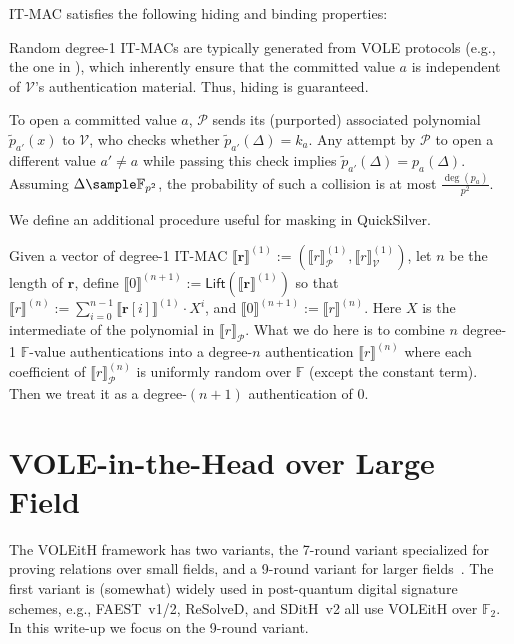 \documentclass[11pt,a4paper]{article}
\theoremstyle{definition}
\theoremstyle{remark}
\newcommand{\F}{\mathbb{F}}
\newcommand{\itmac}[1]{\llbracket {#1} \rrbracket}
\newcommand{\itmacP}[1]{\llbracket {#1} \rrbracket_{\calP}}
\newcommand{\itmacV}[1]{\llbracket {#1} \rrbracket_{\calV}}
\providecommand{\FF}{\mathbb{F}}
\newcommand{\calP}{\mathcal{P}}
\newcommand{\calV}{\mathcal{V}}
\renewcommand{\vec}[1]{\mathbf{#1}}
\begin{document}
IT-MAC satisfies the following hiding and binding properties:
\begin{description}[leftmargin=0.9em, labelsep=0.5em]
	\item[Hiding.] Random degree-1 IT-MACs are typically generated from VOLE protocols
		(e.g., the one in ), which inherently ensure
		that the committed value $a$ is independent of $\calV$'s
		authentication material. Thus, hiding is guaranteed.

	\item[Binding.] To open a committed value $a$, $\calP$ sends its
		(purported) associated polynomial $\tilde{p}_{a'}(x)$ to $\calV$,
		who checks whether $\tilde{p}_{a'}(\Delta) = k_a$.
		Any attempt by $\calP$ to open a different value $a' \neq a$
		while passing this check implies
		$\tilde{p}_{a'}(\Delta) = p_a(\Delta)$.
		Assuming $\Delta \sample \F_{p^2}$, the probability of such a
		collision is at most $\frac{\deg(p_a)}{p^2}$.
\end{description}

We define an additional procedure useful for masking in QuickSilver.
\begin{description}[leftmargin=0.9em, labelsep=0.5em]
	\item[Lifting.] Given a vector of degree-1 IT-MAC 
	$\itmac{\vec{r}}^{(1)} := (\itmacP{r}^{(1)}, \itmacV{r}^{(1)})$, 
	let $n$ be the length of $\vec{r}$, 
	define $\itmac{0}^{(n+1)} := \mathsf{Lift}(\itmac{\vec{r}}^{(1)})$ so that
	$\itmac{r}^{(n)} := \sum_{i = 0}^{n-1} \itmac{\vec{r}[i]}^{(1)} \cdot X^{i}$, and 
	$\itmac{0}^{(n+1)} := \itmac{r}^{(n)}$.
	Here $X$ is the intermediate of the polynomial in $\itmacP{r}$.
	What we do here is to combine $n$ degree-1 $\F$-value authentications
	into a degree-$n$ authentication $\itmac{r}^{(n)}$ where each coefficient of 
	$\itmacP{r}^{(n)}$ is uniformly random over $\F$ (except the constant term).
	Then we treat it as a degree-$(n+1)$ authentication of $0$.
\end{description}


\section{VOLE-in-the-Head over Large Field}
\label{sec:voleith}

The VOLEitH framework has two variants, the 7-round variant specialized
for proving relations over small fields, and a 9-round variant for larger
fields~\cite{baumPubliclyVerifiableZeroKnowledge2023}.
The first variant is (somewhat) widely used in post-quantum digital
signature schemes, e.g., FAEST~v1/2, ReSolveD, and SDitH~v2 all use VOLEitH
over $\FF_{2}$.
In this write-up we focus on the 9-round variant.
\end{document}
